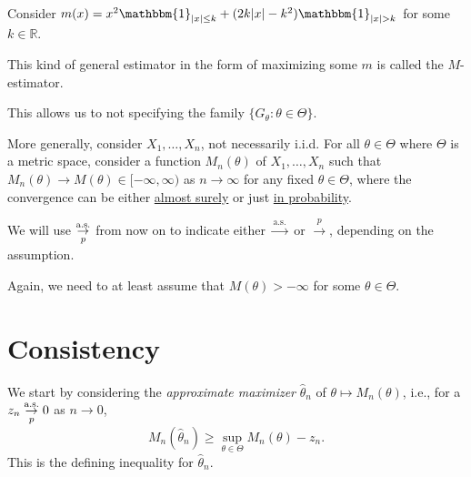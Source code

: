 \begin{eg}
	Consider \(m(x) = x^2 \mathbbm{1}_{\lvert x \rvert \leq k} + (2k\lvert x \rvert - k^2) \mathbbm{1}_{\lvert x \rvert > k} \) for some \(k \in \mathbb{R} \).
\end{eg}

This kind of general estimator in the form of maximizing some \(m\) is called the \(M\)-estimator.

\begin{definition}[\(M\)-estimator]\label{def:M-estimator}
\end{definition}

\begin{intuition}
	This allows us to not specifying the family \(\{ G_\theta \colon \theta \in \Theta  \} \).
\end{intuition}

More generally, consider \(X_1, \dots , X_n \), not necessarily i.i.d. For all \(\theta \in \Theta \) where \(\Theta \) is a metric space, consider a function \(M_n(\theta )\) of \(X_1, \dots , X_n\) such that \(M_n(\theta ) \to M(\theta ) \in [-\infty , \infty )\) as \(n \to \infty \) for any fixed \(\theta \in \Theta \), where the convergence can be either \hyperref[def:converge-almost-surely]{almost surely} or just \hyperref[def:converge-in-probability]{in probability}.

\begin{notation}
	We will use \(\overunderset{\text{a.s.}}{p}{\to } \) from now on to indicate either \(\overset{\text{a.s.} }{\to} \) or \(\overset{p}{\to} \), depending on the assumption.
\end{notation}



\begin{note}
	Again, we need to at least assume that \(M(\theta ) > -\infty \) for some \(\theta  \in \Theta \).
\end{note}

\section{Consistency}
We start by considering the \emph{approximate maximizer} \(\hat{\theta} _n\) of \(\theta \mapsto M_n(\theta )\), i.e., for a \(z_n \overunderset{\text{a.s.}}{p}{\to } 0\) as \(n \to 0\),
\begin{equation}\label{eq:M-estimator}
	M_n(\hat{\theta} _n)
	\geq \sup _{\theta \in \Theta } M_n(\theta ) - z_n.
\end{equation}
This is the defining inequality for \(\hat{\theta} _n\).

